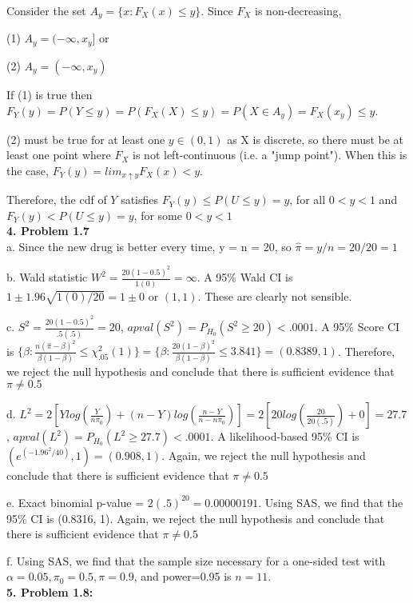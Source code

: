 \documentclass{article}
\begin{document}
Consider the set $A_y = \{x:F_X(x) \leq y\}$. Since $F_X$ is non-decreasing, 

(1) $A_y = (-\infty, x_y]$ or 

(2) $A_y = (-\infty, x_y)$

If (1) is true then $F_Y(y) = P(Y \leq y) = P(F_X(X) \leq y) = P(X \in A_y) = F_X(x_y) \leq y$.

(2) must be true for at least one $y \in (0,1)$ as X is discrete, so there must be at least one point where $F_X$ is not left-continuous (i.e. a "jump point"). When this is the case, $F_Y(y) = lim_{x\uparrow y} F_X(x) < y$.

Therefore, the cdf of $Y$ satisfies $F_Y(y) \leq P(U \leq y) =y$, for all $0<y<1$ and $F_Y(y)< P(U\leq y) =y$, for some $0< y <1$
\\

\textbf{4. Problem 1.7}\\

a. Since the new drug is better every time, y = n = 20, so $\hat{\pi} = y/n = 20/20 = 1$

b. Wald statistic $W^2=\frac{20(1-0.5)^2}{1(0)} = \infty$. A 95\% Wald CI is $1 \pm 1.96\sqrt{1(0)/20} = 1 \pm 0$ or $(1,1)$. These are clearly not sensible.

c. $S^2=\frac{20(1-0.5)^2}{.5(.5)} = 20$, $apval(S^2) = P_{H_0}(S^2 \geq 20) <.0001$. A 95\% Score CI is $\{\beta: \frac{n(\hat\pi -\beta)^2}{\beta(1-\beta)} \leq \chi^2_{.05}(1)\} = \{\beta: \frac{20(1 -\beta)^2}{\beta(1-\beta)} \leq 3.841\} = (0.8389, 1)$. Therefore, we reject the null hypothesis and conclude that there is sufficient evidence that $\pi \neq 0.5$

d. $L^2 = 2[Ylog(\frac{Y}{n\pi_0}) + (n-Y)log(\frac{n-Y}{n-n\pi_0})] = 2[20log(\frac{20}{20(.5)}) + 0] = 27.7$, $apval(L^2) = P_{H_0}(L^2 \geq 27.7) < .0001$. A likelihood-based 95\% CI is $(e^{(-1.96^2/40)}, 1) = (0.908, 1)$. Again, we reject the null hypothesis and conclude that there is sufficient evidence that $\pi \neq 0.5$

e. Exact binomial p-value = $2(.5)^{20} = 0.00000191$. Using SAS, we find that the 95\% CI is (0.8316, 1). Again, we reject the null hypothesis and conclude that there is sufficient evidence that $\pi \neq 0.5$

f. Using SAS, we find that the sample size necessary for a one-sided test with $\alpha=0.05, \pi_0=0.5, \pi=0.9$, and power=0.95 is $n=11$.\\


\textbf{5. Problem 1.8:}\\
\end{document}
